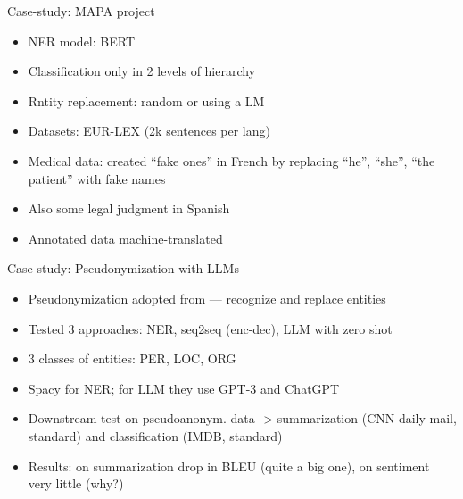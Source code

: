 \documentclass[12pt,aspectratio=169,handout]{beamer}
\begin{document}
\begin{frame}{Case-study: MAPA project}

\begin{itemize}
\item  NER model: BERT
\item  Classification only in 2 levels of hierarchy
\item  Rntity replacement: random or using a LM
\item  Datasets: EUR-LEX (2k sentences per lang)
\item  Medical data: created “fake ones” in French by replacing “he”, “she”, “the patient” with fake names
\item  Also some legal judgment in Spanish
\item  Annotated data machine-translated
\end{itemize}

\end{frame}




\begin{frame}{Case study: Pseudonymization with LLMs}

\begin{itemize}
\item Pseudonymization adopted from \citet{Eder.et.al.2022.LREC} --- recognize and replace entities
\item Tested 3 approaches: NER, seq2seq (enc-dec), LLM with zero shot
\item 3 classes of entities: PER, LOC, ORG
\item Spacy for NER; for LLM they use GPT-3 and ChatGPT
\item Downstream test on pseudoanonym. data -> summarization (CNN daily mail, standard) and classification (IMDB, standard)
\item Results: on summarization drop in BLEU (quite a big one), on sentiment very little (why?)
\end{itemize}


\end{frame}
\end{document}
